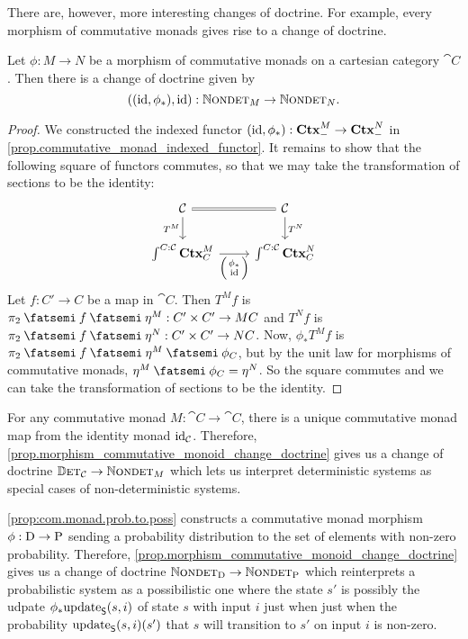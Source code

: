 \documentclass[DynamicalBook]{subfiles}
\begin{document}
There are, however, more interesting changes of doctrine. For example, every
morphism of commutative monads gives rise to a change of doctrine.

\begin{proposition}\label{prop.morphism_commutative_monoid_change_doctrine}
  Let $\phi : M \to N$ be a morphism of commutative monads on a cartesian
  category $\cat{C}$. Then there is a change of doctrine given by
  \[
((\mathrm{id}, \phi_{\ast}), \mathrm{id}) : \mathbb{N}\textsc{ondet}_{M} \to \mathbb{N}\textsc{ondet}_{N}.
  \]
\end{proposition}
\begin{proof}
We constructed the indexed functor $(\mathrm{id}, \phi_{\ast}) : \textbf{Ctx}_{-}^M \to
\textbf{Ctx}_{-}^N$ in \cref{prop.commutative_monad_indexed_functor}. It remains to
show that the following square of functors commutes, so that we may take the
transformation of sections to be the identity:
\[
  \begin{tikzcd}
\cat{C} \ar[r, equals]\ar[d,"T^M"'] & \cat{C}  \ar[d,"T^N"]\\
  \int^{C : \cat{C}}\smctx{C}^M \ar[r, "{\littlelens{\phi_{\ast}}{\id}}"']  & \int^{C : \cat{C}}
  \smctx{C}^N  
  \end{tikzcd}
\]
Let $f : C' \to C$ be a map in $\cat{C}$. Then $T^Mf$ is $\pi_2 \then f \then \eta^M
: C' \times C' \to MC$ and $T^N f$ is $\pi_2 \then f \then \eta^N
: C' \times C' \to NC$. Now, $\phi_{\ast}T^M f$ is $\pi_2 \then f \then \eta^M
\then \phi_C$, but by the unit law for morphisms of commutative monads, $\eta^M
\then \phi_C = \eta^N$. So the square commutes and we can take the
transformation of sections to be the identity.
\end{proof}
  
\begin{example}\label{ex:commutative.monad.change.doctrine.det}
  For any commutative monad $M : \cat{C} \to \cat{C}$, there is a unique commutative monad map from
  the identity monad $\mathrm{id}_{\mathcal{C}}$. Therefore,
  \cref{prop.morphism_commutative_monoid_change_doctrine} gives us a change of
  doctrine $\mathbb{D}\textsc{et}_{\mathcal{C}} \to \mathbb{N}\textsc{ondet}_{M}$ which lets us interpret
  deterministic systems as special cases of non-deterministic systems.
\end{example}

\begin{example}\label{ex:commutative.monad.change.doctrine.prob.to.poss}
\cref{prop:com.monad.prob.to.poss} constructs a commutative monad morphism $\phi
: \mathrm{D} \to \mathrm{P}$ sending a probability distribution to the set of
elements with non-zero probability. Therefore,
\cref{prop.morphism_commutative_monoid_change_doctrine} gives us a change of
doctrine $\mathbb{N}\textsc{ondet}_{\mathrm{D}} \to \mathbb{N}\textsc{ondet}_{\mathrm{P}}$ which reinterprets a
probabilistic system as a possibilistic one where the state $s'$ is possibly the
udpate $\phi_{\ast}\mathrm{update}_{\mathsf{S}}(s, i)$ of state $s$ with input $i$ just when just
when the probability $\mathrm{update}_{\mathsf{S}}(s, i)(s')$ that $s$ will transition to $s'$ on
input $i$ is non-zero.
\end{example}
\end{document}
